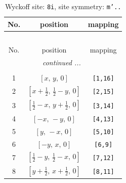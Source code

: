 \documentclass[fleqn,8pt]{jsarticle}
\begin{document}
\renewcommand{\arraystretch}{1.2}
\begin{longtable}{ccc}
\caption{Wyckoff site: {\tt 8i}, site symmetry: {\tt m'..}}
 \\
 \hline \hline
No. & position & mapping \\ \hline \endfirsthead

\multicolumn{2}{l}{\tablename\ \thetable{}} \\
 \hline \hline
No. & position & mapping \\ \hline \endhead

 \hline \hline
\multicolumn{2}{r}{\footnotesize\it continued ...} \\ \endfoot

 \hline \hline
\multicolumn{2}{r}{} \\ \endlastfoot

1 & $\left[ x,\, y,\, 0 \right]$ & {\tt [1,16]} \\ \hline
2 & $\left[ x + \frac{1}{2},\, \frac{1}{2} - y,\, 0 \right]$ & {\tt [2,15]} \\ \hline
3 & $\left[ \frac{1}{2} - x,\, y + \frac{1}{2},\, 0 \right]$ & {\tt [3,14]} \\ \hline
4 & $\left[ - x,\, - y,\, 0 \right]$ & {\tt [4,13]} \\ \hline
5 & $\left[ y,\, - x,\, 0 \right]$ & {\tt [5,10]} \\ \hline
6 & $\left[ - y,\, x,\, 0 \right]$ & {\tt [6,9]} \\ \hline
7 & $\left[ \frac{1}{2} - y,\, \frac{1}{2} - x,\, 0 \right]$ & {\tt [7,12]} \\ \hline
8 & $\left[ y + \frac{1}{2},\, x + \frac{1}{2},\, 0 \right]$ & {\tt [8,11]} \\
\end{longtable}
\renewcommand{\arraystretch}{1.2}
\end{document}
